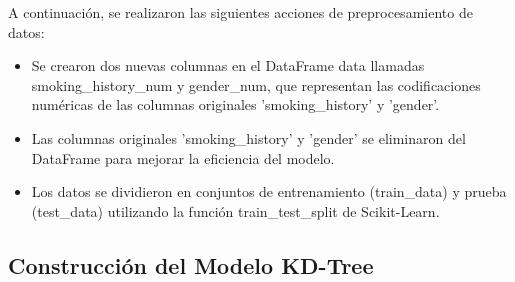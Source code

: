 \documentclass[]{article}
\begin{document}
\begin{comment}
	
\begin{table}[ht]
	\centering
	\caption{Tabla sin líneas verticales}
	\begin{tabular}{cccccccccc} %
		\hline
		 &gender&age &hypertension &heart\_disease &smoking\_history &bmi &HbA1c\_level &blood\_glucose\_level&diabetes\\
		\hline
		&0 	&80.0 	&0 	&1 &25.19 	&6.6 	&140 	&0\\
		&1 	&54.0 	&0 	&0 	&27.32 	&6.6 	&80 	&-1\\
		&2 	&28.0 	&0 	&0 	&27.32 	&5.7 	&158 	&0\\
		&3 	&36.0 	&0 	&0 	&23.45 	&5.0 	&155 	&2\\
		&4 	&76.0 	&1 	&1 	&20.14 	&4.8 	&155 	&2\\
		&... 	&... 	&... 	&... 	&... 	&... 	&... 	&...\\
		&995 	&62.0 	&0 	&0 	&29.26 	&5.0 	&200 	&0\\
		&996 	&44.0 	&0 	&0 	&46.07 	&5.0 	&145 	&-1\\
		&997 	&21.0 	&0 	&0 	&31.44 	&6.2 	&85 	&0\\
		&998 	&45.0 	&0 	&1 	&38.25 	&6.1 	&140 	&2\\
		&999 	&43.0 	&0 	&0 	&27.32 	&6.6 	&130 	&0\\
		\hline
	\end{tabular}
\end{table}
x\end{comment}
A continuación, se realizaron las siguientes acciones de preprocesamiento de datos:
\begin{itemize}
	\item Se crearon dos nuevas columnas en el DataFrame data llamadas smoking\_history\_num y gender\_num, que representan las codificaciones numéricas de las columnas originales 'smoking\_history' y 'gender'.
	\item Las columnas originales 'smoking\_history' y 'gender' se eliminaron del DataFrame para mejorar la eficiencia del modelo.
	\item Los datos se dividieron en conjuntos de entrenamiento (train\_data) y prueba (test\_data) utilizando la función train\_test\_split de Scikit-Learn.
\end{itemize}

\subsection{Construcción del Modelo KD-Tree}
\end{document}
